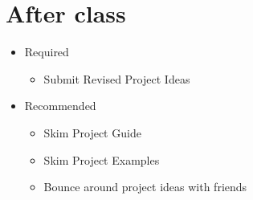 \documentclass[11pt]{article}
\begin{document}
\section*{After class}

\begin{itemize}
\item Required
\begin{itemize}
\item Submit Revised Project Ideas 
\end{itemize}
\item Recommended
\begin{itemize}
\item Skim Project Guide
\item Skim Project Examples
\item Bounce around project ideas with friends
\end{itemize}
\end{itemize}



\end{document}
